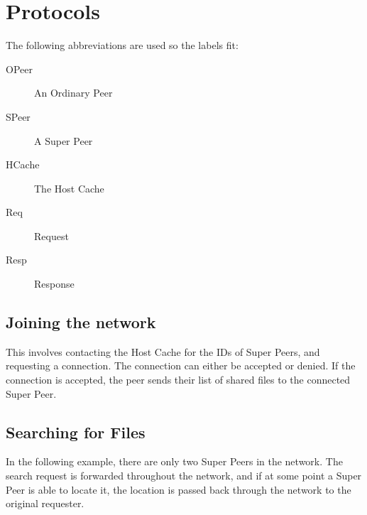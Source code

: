 \section{Protocols}

\secttoc

The following abbreviations are used so the labels fit:

\begin{description}
  \item[OPeer] An Ordinary Peer
  \item[SPeer] A Super Peer
  \item[HCache] The Host Cache
  \item[Req] Request
  \item[Resp] Response
\end{description}

\subsection{Joining the network}

This involves contacting the Host Cache for the IDs of Super Peers, and
requesting a connection.  The connection can either be accepted or denied. If
the connection is accepted, the peer sends their list of shared files to the
connected Super Peer.

\noindent{}

\subsection{Searching for Files}

In the following example, there are only two Super Peers in the network.  The
search request is forwarded throughout the network, and if at some point a Super
Peer is able to locate it, the location is passed back through the network to
the original requester.

